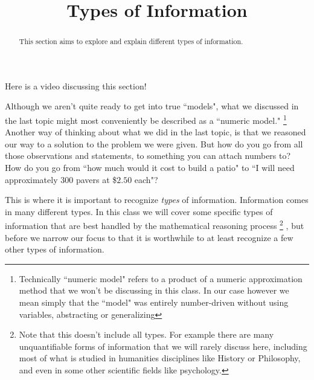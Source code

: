 \documentclass{ximera}
\title{Types of Information}
\begin{document}
\begin{abstract}
    This section aims to explore and explain different types of information.
\end{abstract}
\maketitle

Here is a video discussing this section!



Although we aren't quite ready to get into true ``models", what we discussed in the last topic might most conveniently be described as a ``numeric model."%
\footnote{Technically ``numeric model" refers to a product of a numeric approximation method that we won't be discussing in this class. In our case however we mean simply that the ``model" was entirely number-driven without using variables, abstracting or generalizing}
Another way of thinking about what we did in the last topic, is that we reasoned our way to a solution to the problem we were given. But how do you go from all those observations and statements, to something you can attach numbers to? How do you go from ``how much would it cost to build a patio" to ``I will need approximately 300 pavers at \$$2.50$ each"?

This is where it is important to recognize \textit{types} of information. Information comes in many different types. In this class we will cover some specific types of information that are best handled by the mathematical reasoning process%
\footnote{Note that this doesn't include all types. For example there are many unquantifiable forms of information that we will rarely discuss here, including most of what is studied in humanities disciplines like History or Philosophy, and even in some other scientific fields like psychology.}%
, but before we narrow our focus to that it is worthwhile to at least recognize a few other types of information.
\end{document}
